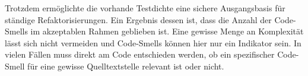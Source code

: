 Trotzdem ermöglichte die vorhande Testdichte eine sichere Ausgangsbasis für ständige Refaktorisierungen. Ein Ergebnis dessen ist, dass die Anzahl der Code-Smells im akzeptablen Rahmen geblieben ist. Eine gewisse Menge an Komplexität lässt sich nicht vermeiden und Code-Smells können hier nur ein Indikator sein. In vielen Fällen muss direkt am Code entschieden werden, ob ein spezifischer Code-Smell für eine gewisse Quelltextstelle relevant ist oder nicht.
